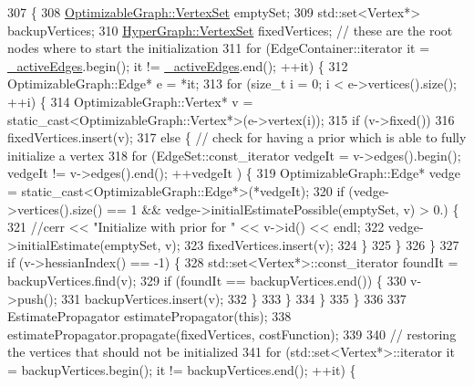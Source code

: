 \begin{DoxyCode}
307   \{
308     \hyperlink{classg2o_1_1HyperGraph_a703938cdb4bb636860eed55a2489d70c}{OptimizableGraph::VertexSet} emptySet;
309     std::set<Vertex*> backupVertices;
310     \hyperlink{classg2o_1_1HyperGraph_a703938cdb4bb636860eed55a2489d70c}{HyperGraph::VertexSet} fixedVertices; \textcolor{comment}{// these are the root nodes where to start
       the initialization}
311     \textcolor{keywordflow}{for} (EdgeContainer::iterator it = \hyperlink{classg2o_1_1SparseOptimizer_a3207df163943bc1672fc7872964a6d6c}{\_activeEdges}.begin(); it != 
      \hyperlink{classg2o_1_1SparseOptimizer_a3207df163943bc1672fc7872964a6d6c}{\_activeEdges}.end(); ++it) \{
312       OptimizableGraph::Edge* e = *it;
313       \textcolor{keywordflow}{for} (\textcolor{keywordtype}{size\_t} i = 0; i < e->vertices().size(); ++i) \{
314         OptimizableGraph::Vertex* v = \textcolor{keyword}{static\_cast<}OptimizableGraph::Vertex*\textcolor{keyword}{>}(e->vertex(i));
315         \textcolor{keywordflow}{if} (v->fixed())
316           fixedVertices.insert(v);
317         \textcolor{keywordflow}{else} \{ \textcolor{comment}{// check for having a prior which is able to fully initialize a vertex}
318           \textcolor{keywordflow}{for} (EdgeSet::const\_iterator vedgeIt = v->edges().begin(); vedgeIt != v->edges().end(); ++vedgeIt
      ) \{
319             OptimizableGraph::Edge* vedge = \textcolor{keyword}{static\_cast<}OptimizableGraph::Edge*\textcolor{keyword}{>}(*vedgeIt);
320             \textcolor{keywordflow}{if} (vedge->vertices().size() == 1 && vedge->initialEstimatePossible(emptySet, v) > 0.) \{
321               \textcolor{comment}{//cerr << "Initialize with prior for " << v->id() << endl;}
322               vedge->initialEstimate(emptySet, v);
323               fixedVertices.insert(v);
324             \}
325           \}
326         \}
327         \textcolor{keywordflow}{if} (v->hessianIndex() == -1) \{
328           std::set<Vertex*>::const\_iterator foundIt = backupVertices.find(v);
329           \textcolor{keywordflow}{if} (foundIt == backupVertices.end()) \{
330             v->push();
331             backupVertices.insert(v);
332           \}
333         \}
334       \}
335     \}
336 
337     EstimatePropagator estimatePropagator(\textcolor{keyword}{this});
338     estimatePropagator.propagate(fixedVertices, costFunction);
339 
340     \textcolor{comment}{// restoring the vertices that should not be initialized}
341     \textcolor{keywordflow}{for} (std::set<Vertex*>::iterator it = backupVertices.begin(); it != backupVertices.end(); ++it) \{

\end{DoxyCode}
